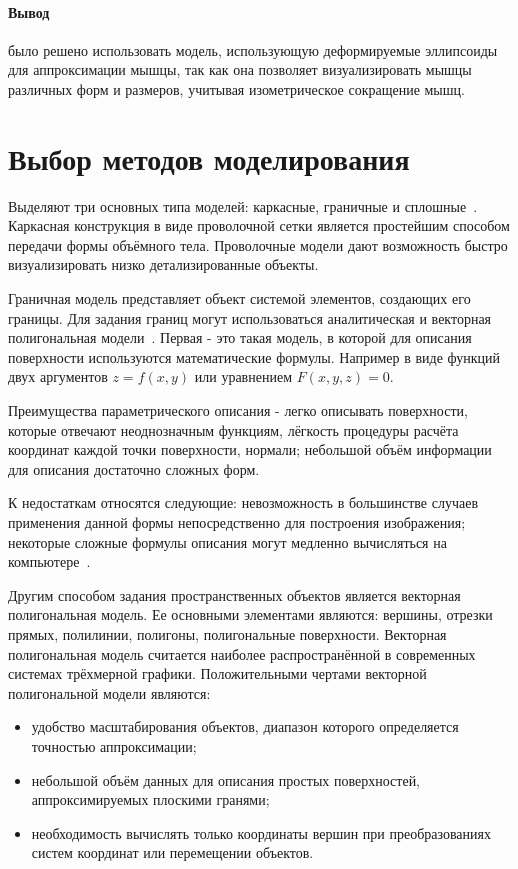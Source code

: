 \paragraph{Вывод} было решено использовать модель, использующую деформируемые эллипсоиды для аппроксимации мышцы, так как она позволяет визуализировать мышцы различных форм и размеров, учитывая изометрическое сокращение мышц.

\section{Выбор методов моделирования}
\label{sec:model_meth}
Выделяют три основных типа моделей: каркасные, граничные и сплошные~\cite{nikulin}. Каркасная конструкция в виде проволочной сетки является простейшим способом передачи формы объёмного тела. Проволочные модели дают возможность быстро визуализировать низко детализированные объекты.
\par Граничная модель представляет объект системой элементов, создающих его границы. Для задания границ могут использоваться аналитическая и векторная полигональная модели~\cite{porev}. Первая - это такая модель, в которой для описания поверхности используются математические формулы. Например в виде функций двух аргументов $ z = f(x, y)$ или уравнением $F(x, y, z) = 0$.
\par Преимущества параметрического описания - легко описывать поверхности, которые отвечают неоднозначным функциям, лёгкость процедуры расчёта координат каждой точки поверхности, нормали; небольшой объём информации для описания достаточно сложных форм.
\par К недостаткам относятся следующие: невозможность в большинстве случаев применения данной формы непосредственно для построения изображения; некоторые сложные формулы описания могут медленно вычисляться на компьютере~\cite{porev}.
\par Другим способом задания пространственных объектов является векторная полигональная модель. Ее основными элементами являются: вершины, отрезки прямых, полилинии, полигоны, полигональные поверхности. Векторная полигональная модель считается наиболее распространённой в современных системах трёхмерной графики. Положительными чертами векторной полигональной модели являются:
\begin{itemize}
	\item удобство масштабирования объектов, диапазон которого определяется точностью аппроксимации;
	\item небольшой объём данных для описания простых поверхностей, аппроксимируемых плоскими гранями;
	\item необходимость вычислять только координаты вершин при преобразованиях систем координат или перемещении объектов.
\end{itemize}
